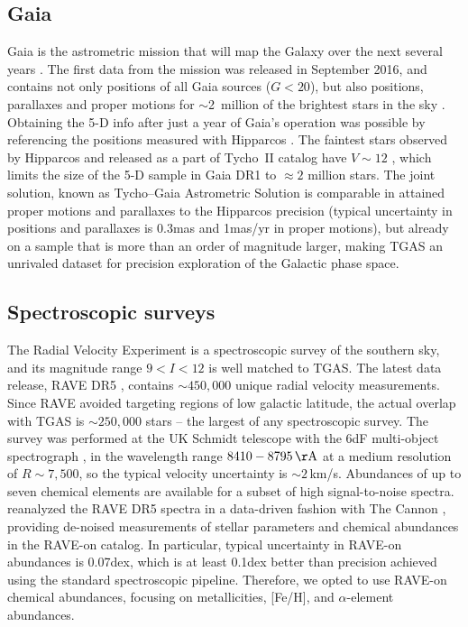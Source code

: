 \documentclass[apj, twocolappendix, numberedappendix, appendixfloats]{emulateapj}
\begin{document}
\subsection{Gaia}
\label{gaia}
Gaia is the astrometric mission that will map the Galaxy over the next several years \citep{perryman2001}.
The first data from the mission was released in September 2016, and contains not only positions of all Gaia sources ($G<20$), but also positions, parallaxes and proper motions for $\sim$2~million of the brightest stars in the sky \citep{gaiadr1, gaiamission}.
Obtaining the 5-D info after just a year of Gaia's operation was possible by referencing the positions measured with Hipparcos \citep{michalik2015}.
The faintest stars observed by Hipparcos \citep{hipparcos, vleeuwen2007} and released as a part of Tycho~II catalog have $V\sim12$ \citep{hog2000}, which limits the size of the 5-D sample in Gaia DR1 to $\approx2$ million stars.
The joint solution, known as Tycho--Gaia Astrometric Solution \citep[TGAS,][]{gaiaastrometry} is comparable in attained proper motions and parallaxes to the Hipparcos precision (typical uncertainty in positions and parallaxes is 0.3\;mas and 1\;mas/yr in proper motions), but already on a sample that is more than an order of magnitude larger, making TGAS an unrivaled dataset for precision exploration of the Galactic phase space.

\subsection{Spectroscopic surveys}
\label{rvsurveys}
The Radial Velocity Experiment \citep[RAVE,][]{steinmetz2006} is a spectroscopic survey of the southern sky, and its magnitude range $9<I<12$ is well matched to TGAS.
The latest data release, RAVE DR5 \citep{kunder2017}, contains $\sim450,000$ unique radial velocity measurements.
Since RAVE avoided targeting regions of low galactic latitude, the actual overlap with TGAS is $\sim250,000$ stars -- the largest of any spectroscopic survey.
The survey was performed at the UK Schmidt telescope with the 6dF multi-object spectrograph \citep{6df}, in the wavelength range $8410-8795\,\rm\AA$ at a medium resolution of $R\sim7,500$, so the typical velocity uncertainty is $\sim2$\,km/s.
Abundances of up to seven chemical elements are available for a subset of high signal-to-noise spectra.
\citet{casey2016} reanalyzed the RAVE DR5 spectra in a data-driven fashion with The Cannon \citep{ness2015}, providing de-noised measurements of stellar parameters and chemical abundances in the RAVE-on catalog.
In particular, typical uncertainty in RAVE-on abundances is 0.07\;dex, which is at least 0.1\;dex better than precision achieved using the standard spectroscopic pipeline.
Therefore, we opted to use RAVE-on chemical abundances, focusing on metallicities, [Fe/H], and $\alpha$-element abundances.
\end{document}
